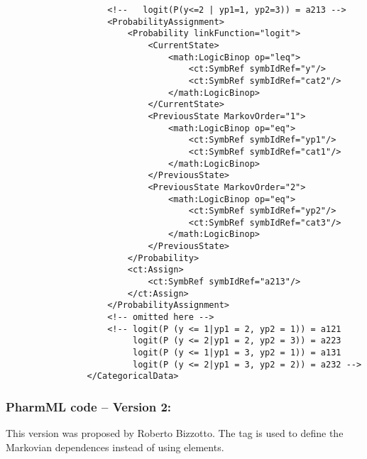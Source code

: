 \begin{lstlisting}
                    <!--   logit(P(y<=2 | yp1=1, yp2=3)) = a213 -->
                    <ProbabilityAssignment>
                        <Probability linkFunction="logit">
                            <CurrentState>
                                <math:LogicBinop op="leq">
                                    <ct:SymbRef symbIdRef="y"/>
                                    <ct:SymbRef symbIdRef="cat2"/>
                                </math:LogicBinop>
                            </CurrentState>
                            <PreviousState MarkovOrder="1">
                                <math:LogicBinop op="eq">
                                    <ct:SymbRef symbIdRef="yp1"/>
                                    <ct:SymbRef symbIdRef="cat1"/>
                                </math:LogicBinop>
                            </PreviousState>
                            <PreviousState MarkovOrder="2">
                                <math:LogicBinop op="eq">
                                    <ct:SymbRef symbIdRef="yp2"/>
                                    <ct:SymbRef symbIdRef="cat3"/>
                                </math:LogicBinop>
                            </PreviousState>
                        </Probability>
                        <ct:Assign>
                            <ct:SymbRef symbIdRef="a213"/>
                        </ct:Assign>
                    </ProbabilityAssignment>
                    <!-- omitted here -->
                    <!-- logit(P (y <= 1|yp1 = 2, yp2 = 1)) = a121 
                         logit(P (y <= 2|yp1 = 2, yp2 = 3)) = a223 
                         logit(P (y <= 1|yp1 = 3, yp2 = 1)) = a131 
                         logit(P (y <= 2|yp1 = 3, yp2 = 2)) = a232 -->
                </CategoricalData>            
 \end{lstlisting}


\subsubsection{PharmML code -- Version 2:}
This version was proposed by Roberto Bizzotto. 
The  tag is used to define the Markovian dependences
instead of using  elements.


